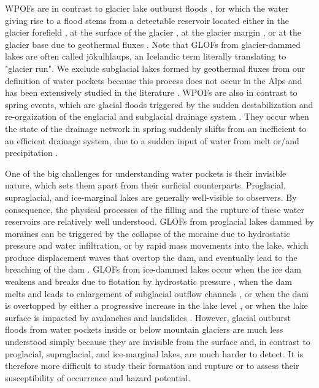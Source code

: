 WPOFs are in contrast to glacier lake outburst floods \citep[GLOFs, see][for reviews]{Roberts2005, Bjornsson2010,Carrivick&Tweed2016,Emmer&al2022,Zhang&al2024}, for which the water giving rise to a flood stems from a detectable reservoir located either in the glacier forefield \citep[i.e.\ proglacial lake, see][for a review]{Neupane&al2019}, at the surface of the glacier \citep[i.e.\ supraglacial lake, e.g.][]{Walder&Costa1996,Raymond&al2003,Kingslake&al2015}, at the glacier margin \citep[i.e.\ ice-marginal lake, e.g.][]{Huss&al2007}, or at the glacier base due to geothermal fluxes \citep[i.e.\ subglacial lake, see][]{Bjornsson2010}. Note that GLOFs from glacier-dammed lakes are often called jökulhlaups, an Icelandic term literally translating to "glacier run". We exclude subglacial lakes formed by geothermal fluxes from our definition of water pockets because this process does not occur in the Alps and has been extensively studied in the literature \citep[e.g.][]{Bjornsson2010,Livingstone&al2022}. WPOFs are also in contrast to spring events, which are glacial floods triggered by the sudden destabilization and re-orgaization of the englacial and subglacial drainage system \citep[e.g.][]{Iken&Bindschadler1986, Kamb1987,Warburton&Fenn1994}. They occur when the state of the drainage network in spring suddenly shifts from an inefficient to an efficient drainage system, due to a sudden input of water from melt or/and precipitation \citep[e.g.][]{Walder&Driedger1995}. 

One of the big challenges for understanding water pockets is their invisible nature, which sets them apart from their surficial counterparts. Proglacial, supraglacial, and ice-marginal lakes are generally well-visible to observers. By consequence, the physical processes of the filling and the rupture of these water reservoirs are relatively well understood. GLOFs from proglacial lakes dammed by moraines can be triggered by the collapse of the moraine due to hydrostatic pressure and water infiltration, or by rapid mass movements into the lake, which produce displacement waves that overtop the dam, and eventually lead to the breaching of the dam \citep{Neupane&al2019}. GLOFs from ice-dammed lakes occur when the ice dam weakens and breaks due to flotation by hydrostatic pressure \citep[e.g.][]{Bjornsson2010}, when the dam melts and leads to enlargement of subglacial outflow channels \citep{Nye1976}, or when the dam is overtopped by either a progressive increase in the lake level \citep[e.g.][]{Raymond&Nolan2000, Ogier&al2021}, or when the lake surface is impacted by avalanches and landslides \citep[e.g.][]{Haeberli1983, Clague&Evans2000}. However, glacial outburst floods from water pockets inside or below mountain glaciers are much less understood simply because they are invisible from the surface and, in contrast to proglacial, supraglacial, and ice-marginal lakes, are much harder to detect. It is therefore more difficult to study their formation and rupture or to assess their susceptibility of occurrence and hazard potential.

